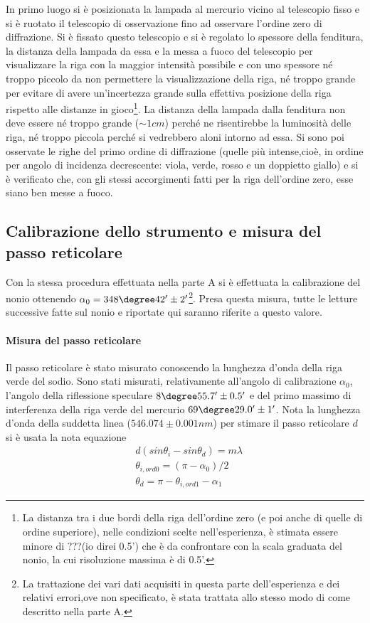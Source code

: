 \documentclass[a4paper,10pt]{article}
\begin{document}
{{{{{{In primo luogo si è posizionata la lampada al mercurio vicino al telescopio fisso e si è ruotato il telescopio di osservazione fino ad osservare l'ordine zero di diffrazione. Si è fissato questo telescopio e si è regolato lo spessore della fenditura, la distanza della lampada da essa e la messa a fuoco del telescopio per visualizzare la riga con la maggior intensità possibile e con uno spessore né troppo piccolo da non permettere la visualizzazione della riga, né troppo grande per evitare di avere un'incertezza grande sulla effettiva posizione della riga rispetto alle distanze in gioco\footnote{La distanza tra i due bordi della riga dell'ordine zero (e poi anche di quelle di ordine superiore), nelle condizioni scelte nell'esperienza, è stimata essere minore di ???(io direi 0.5') che è da confrontare con la scala graduata del nonio, la cui risoluzione massima è di 0.5'.}.
La distanza della lampada dalla fenditura non deve essere né troppo grande ($\sim 1 cm$) perché ne risentirebbe la luminosità delle riga, né troppo piccola perché si vedrebbero aloni intorno ad essa.
Si sono poi osservate le righe del primo ordine di diffrazione (quelle più intense,cioè, in ordine per angolo di incidenza decrescente: viola, verde, rosso e un doppietto giallo) e si è verificato che, con gli stessi accorgimenti fatti per la riga dell'ordine zero, esse siano ben messe a fuoco.

\subsection{Calibrazione dello strumento e misura del passo reticolare}
Con la stessa procedura effettuata nella parte A si è effettuata la calibrazione del nonio ottenendo $\alpha_0 = 348\degree 42' \pm  2' $\footnote{La trattazione dei vari dati acquisiti in questa parte dell'esperienza e dei relativi errori,ove non specificato, è stata trattata allo stesso modo di come descritto nella parte A.}. Presa questa misura, tutte le letture successive fatte sul nonio e riportate qui saranno riferite a questo valore.


\paragraph{Misura del passo reticolare}
Il passo reticolare è stato misurato conoscendo la lunghezza d'onda della riga verde del sodio. Sono stati misurati, relativamente all'angolo di calibrazione $\alpha_0$, l'angolo della riflessione speculare $8\degree 55.7' \pm 0.5'$ e del primo massimo di interferenza della riga verde del mercurio $69\degree 29.0'\pm 1'$. Nota la lunghezza d'onda della suddetta linea ($546.074 \pm 0.001 nm$) per stimare il passo reticolare $d$ si è usata la nota equazione 
\begin{align*}
&d(sin \theta_i - sin \theta_d) = m\lambda\\
&\theta_{i,ord0} = (\pi - \alpha_0)/2\\
&\theta_d = \pi - \theta_{i,ord1} - \alpha_1
\end{align*}

}}}}}}
\end{document}
